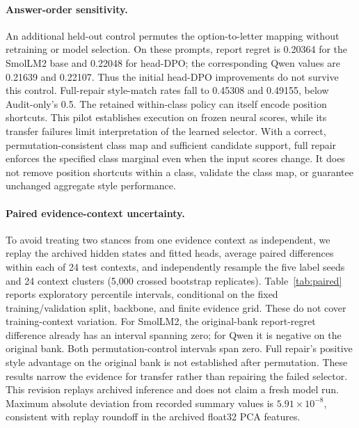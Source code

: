 \paragraph{Answer-order sensitivity.}
An additional held-out control permutes the option-to-letter mapping
without retraining or model selection. On these prompts, report regret
is 0.20364 for the SmolLM2 base and 0.22048 for head-DPO; the corresponding
Qwen values are 0.21639 and 0.22107. Thus the initial head-DPO improvements
do not survive this control. Full-repair style-match rates fall to 0.45308
and 0.49155, below Audit-only's 0.5. The retained within-class policy can
itself encode position shortcuts. This pilot establishes execution on
frozen neural scores, while its transfer failures limit interpretation
of the learned selector.
With a correct, permutation-consistent class map and sufficient candidate
support, full repair enforces the specified class marginal even when the
input scores change. It does not remove position shortcuts within a class,
validate the class map, or guarantee unchanged aggregate style performance.


\paragraph{Paired evidence-context uncertainty.}
To avoid treating two stances from one evidence context as independent,
we replay the archived hidden states and fitted heads, average paired
differences within each of 24 test contexts, and independently resample
the five label seeds and 24 context clusters (5,000 crossed bootstrap
replicates). Table~\ref{tab:paired} reports exploratory percentile intervals,
conditional on the fixed training/validation split, backbone, and finite
evidence grid. These do not cover training-context variation. For SmolLM2,
the original-bank report-regret difference already has an interval spanning
zero; for Qwen it is negative on the original bank. Both permutation-control
intervals span zero. Full repair's positive style advantage on the original
bank is not established after permutation. These results narrow the evidence
for transfer rather than repairing the failed selector. This revision
replays archived inference and does not claim a fresh model run. Maximum
absolute deviation from recorded summary values is $5.91\times10^{-8}$,
consistent with replay roundoff in the archived float32 PCA features.

\begin{table}[t]
\centering\small
\caption{Exploratory paired uncertainty over contexts and label seeds.
Report difference is Head-DPO minus LM-base (negative is better);
style difference is CAEA-1 minus Audit-only (positive is better).
Intervals are percentile bootstrap intervals, not the seed-only
Student-$t$ half-widths in Table~\ref{tab:neural}.}
\label{tab:paired}
\resizebox{\linewidth}{!}{}
\end{table}
